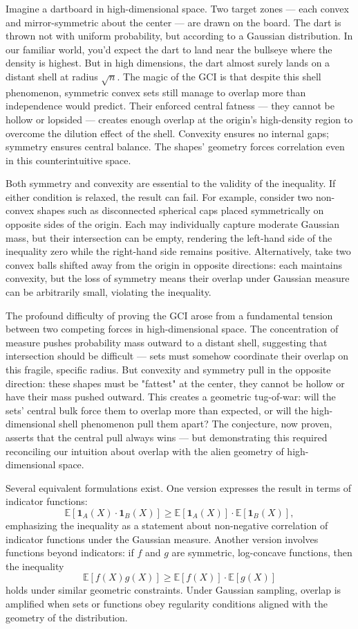 Imagine a dartboard in high-dimensional space. Two target zones — each convex and mirror-symmetric about the center — are drawn on the board. The dart is thrown not with uniform probability, but according to a Gaussian distribution. In our familiar world, you'd expect the dart to land near the bullseye where the density is highest. But in high dimensions, the dart almost surely lands on a distant shell at radius \( \sqrt{n} \). The magic of the GCI is that despite this shell phenomenon, symmetric convex sets still manage to overlap more than independence would predict. Their enforced central fatness — they cannot be hollow or lopsided — creates enough overlap at the origin's high-density region to overcome the dilution effect of the shell. Convexity ensures no internal gaps; symmetry ensures central balance. The shapes' geometry forces correlation even in this counterintuitive space.

Both symmetry and convexity are essential to the validity of the inequality. If either condition is relaxed, the result can fail. For example, consider two non-convex shapes such as disconnected spherical caps placed symmetrically on opposite sides of the origin. Each may individually capture moderate Gaussian mass, but their intersection can be empty, rendering the left-hand side of the inequality zero while the right-hand side remains positive. Alternatively, take two convex balls shifted away from the origin in opposite directions: each maintains convexity, but the loss of symmetry means their overlap under Gaussian measure can be arbitrarily small, violating the inequality.

The profound difficulty of proving the GCI arose from a fundamental tension between two competing forces in high-dimensional space. The concentration of measure pushes probability mass outward to a distant shell, suggesting that intersection should be difficult — sets must somehow coordinate their overlap on this fragile, specific radius. But convexity and symmetry pull in the opposite direction: these shapes must be "fattest" at the center, they cannot be hollow or have their mass pushed outward. This creates a geometric tug-of-war: will the sets' central bulk force them to overlap more than expected, or will the high-dimensional shell phenomenon pull them apart? The conjecture, now proven, asserts that the central pull always wins — but demonstrating this required reconciling our intuition about overlap with the alien geometry of high-dimensional space.

Several equivalent formulations exist. One version expresses the result in terms of indicator functions:
\[
\mathbb{E}[\mathbf{1}_A(X) \cdot \mathbf{1}_B(X)] \geq \mathbb{E}[\mathbf{1}_A(X)] \cdot \mathbb{E}[\mathbf{1}_B(X)],
\]
emphasizing the inequality as a statement about non-negative correlation of indicator functions under the Gaussian measure. Another version involves functions beyond indicators: if \( f \) and \( g \) are symmetric, log-concave functions, then the inequality
\[
\mathbb{E}[f(X)g(X)] \geq \mathbb{E}[f(X)] \cdot \mathbb{E}[g(X)]
\]
holds under similar geometric constraints. Under Gaussian sampling, overlap is amplified when sets or functions obey regularity conditions aligned with the geometry of the distribution.

